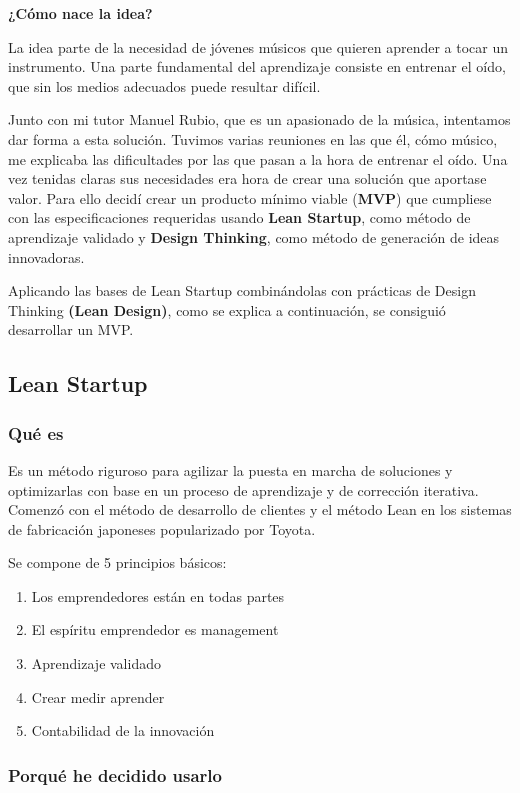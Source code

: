 \documentclass[12pt,twoside,titlepage]{report}
\begin{document}
\textbf{¿Cómo nace la idea?}

La idea parte de la necesidad de jóvenes músicos que quieren aprender a tocar un instrumento. Una parte fundamental del aprendizaje consiste en entrenar el oído, que sin los medios adecuados puede resultar difícil.

Junto con mi tutor Manuel Rubio, que es un apasionado de la música, intentamos dar forma a esta solución. Tuvimos varias reuniones en las que él, cómo músico, me explicaba las dificultades por las que pasan a la hora de entrenar el oído. Una vez tenidas claras sus necesidades era hora de crear una solución que aportase valor. Para ello decidí crear un producto mínimo viable (\textbf{MVP}) que cumpliese con las especificaciones requeridas usando \textbf{Lean Startup}, como método de aprendizaje validado y \textbf{Design Thinking}, como método de generación de ideas innovadoras.

Aplicando las bases de Lean Startup combinándolas con prácticas de Design Thinking \textbf{(Lean Design)}, como se explica a continuación, se consiguió desarrollar un MVP.

\subsection{Lean Startup}
\subsubsection{Qué es}
Es un método riguroso para agilizar la puesta en marcha de soluciones y optimizarlas con base en un proceso de aprendizaje y de corrección iterativa. Comenzó con el método de desarrollo de clientes y el método Lean en los sistemas de fabricación japoneses popularizado por Toyota.

Se compone de 5 principios básicos:
\begin{enumerate}
    \item Los emprendedores están en todas partes
    \item El espíritu emprendedor es management
    \item Aprendizaje validado
    \item Crear medir aprender
    \item Contabilidad de la innovación
\end{enumerate}

\subsubsection{Porqué he decidido usarlo}
\end{document}
